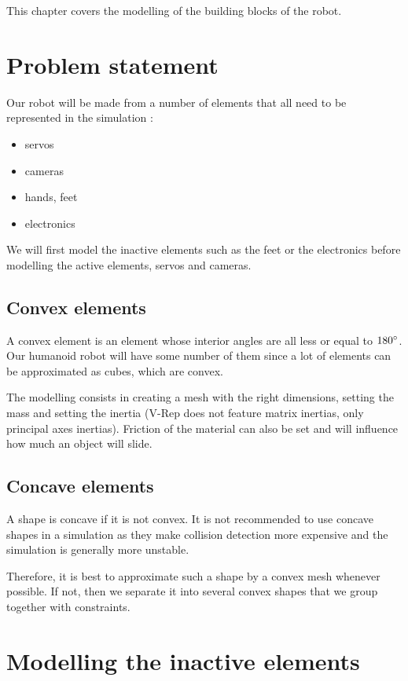 This chapter covers the modelling of the building blocks of the robot.

\section{Problem statement}
Our robot will be made from a number of elements that all need to be represented in the simulation :\begin{itemize}
\item servos
\item cameras
\item hands, feet
\item electronics
\end{itemize}
We will first model the inactive elements such as the feet or the electronics before modelling the active elements, servos and cameras.

\subsection{Convex elements}
A convex element is an element whose interior angles are all less or equal to $180\degree$. Our humanoid robot will have some number of them since a lot of elements can be approximated as cubes, which are convex.

The modelling consists in creating a mesh with the right dimensions, setting the mass and setting the inertia (V-Rep does not feature matrix inertias, only principal axes inertias). Friction of the material can also be set and will influence how much an object will slide.

\subsection{Concave elements}
A shape is concave if it is not convex. It is not recommended to use concave shapes in a simulation as they make collision detection more expensive and the simulation is generally more unstable. 

Therefore, it is best to approximate such a shape by a convex mesh whenever possible. If not, then we separate it into several convex shapes that we group together with constraints.

\section{Modelling the inactive elements}

